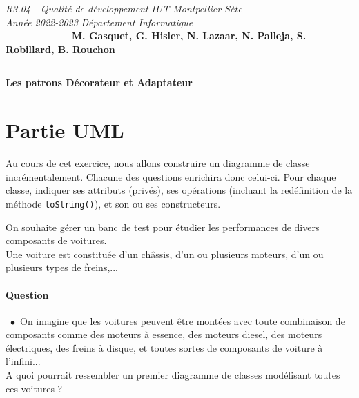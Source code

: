 \documentclass[a4paper,11pt]{exam}
\newcommand{\point}{$\bullet$\ }
\newcommand{\titre}[1]{
	
	\ \hfill {\bf\large #1} \hfill \ 
}
\begin{document}
\pagestyle{plain}

{\noindent
	\textit{R3.04 - Qualité de développement}
	\hfill \textit{IUT Montpellier-Sète}\\
}
{\noindent \textit{Année 2022-2023}
	\hfill \textit{Département Informatique}\\
}
{\noindent \textit{--$\qquad\qquad\qquad$}
	\textbf{M. Gasquet, G. Hisler, N. Lazaar, N. Palleja, S. Robillard, B. Rouchon}\\
}
\vspace*{-0.3cm}
\hrule

\vspace*{1.5cm}
  
\begin{center}
	\huge{\textbf{{Les patrons Décorateur et Adaptateur}}}\\
\end{center}

\setcounter{exo}{0}
\setcounter{question}{0}

\vspace*{0.5cm}

\section{Partie UML}
Au cours de cet exercice, nous allons construire un diagramme de classe incrémentalement. Chacune des questions enrichira donc celui-ci.
Pour chaque classe, indiquer ses attributs (privés), ses opérations (incluant la redéfinition de la méthode \texttt{toString()}), et son ou ses constructeurs. 

On souhaite gérer un banc de test pour étudier les performances de divers composants de voitures. \\
Une voiture est constituée d'un châssis, d'un ou plusieurs moteurs, d'un ou plusieurs types de freins,...


\paragraph*{\textsf{Question \thequestion}}\ 
\point On imagine que les voitures peuvent être montées avec toute combinaison de composants comme des moteurs à essence, des moteurs diesel, des moteurs électriques, des freins à disque, et toutes sortes de composants de voiture à l'infini...\\
A quoi pourrait ressembler un premier diagramme de classes modélisant toutes ces voitures ? 
\end{document}
